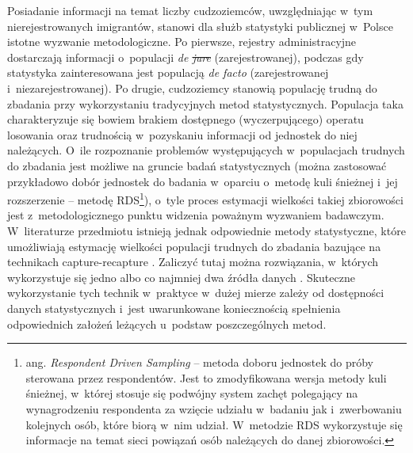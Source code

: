 \documentclass[12pt,a4paper]{article}
\providecommand{\DIFadd}[1]{{\protect\color{blue}\uwave{#1}}} %
\providecommand{\DIFdel}[1]{{\protect\color{red}\sout{#1}}}                      %
\providecommand{\DIFaddbegin}{} %
\providecommand{\DIFaddend}{} %
\providecommand{\DIFdelbegin}{} %
\providecommand{\DIFdelend}{} %
\begin{document}
Posiadanie informacji na temat liczby cudzoziemców, uwzględniając w~tym nierejestrowanych imigrantów, stanowi dla służb statystyki publicznej w~Polsce istotne wyzwanie metodologiczne. Po pierwsze, rejestry administracyjne dostarczają informacji o~populacji \textit{de \DIFdelbegin \DIFdel{jure}\DIFdelend \DIFaddbegin \DIFadd{iure}\DIFaddend } (zarejestrowanej), podczas gdy statystyka zainteresowana jest populacją \textit{de facto} (zarejestrowanej i~niezarejestrowanej). Po drugie, cudzoziemcy stanowią populację trudną do zbadania przy wykorzystaniu tradycyjnych metod statystycznych. Populacja taka charakteryzuje się bowiem brakiem dostępnego (wyczerpującego) operatu losowania oraz trudnością w~pozyskaniu informacji od jednostek do niej należących. O~ile rozpoznanie problemów występujących w~populacjach trudnych do zbadania jest możliwe na gruncie badań statystycznych (można zastosować przykładowo dobór jednostek do badania w~oparciu o~metodę kuli śnieżnej i~jej rozszerzenie -- metodę RDS\footnote{ang. \textit{Respondent Driven Sampling} -- metoda doboru jednostek do próby sterowana przez respondentów. Jest to zmodyfikowana wersja metody kuli śnieżnej, w~której stosuje się podwójny system zachęt polegający na wynagrodzeniu respondenta za wzięcie udziału w~badaniu jak i~zwerbowaniu kolejnych osób, które biorą w~nim udział. W~metodzie RDS wykorzystuje się informacje na temat sieci powiązań osób należących do danej zbiorowości.}), o~tyle proces estymacji wielkości takiej zbiorowości jest z~metodologicznego punktu widzenia poważnym wyzwaniem badawczym. W~literaturze przedmiotu istnieją jednak odpowiednie metody statystyczne, które umożliwiają estymację wielkości populacji trudnych do zbadania bazujące na technikach capture-recapture \citep[por.][]{bohning-capture-recapture-2017}. Zaliczyć tutaj można rozwiązania, w~których wykorzystuje się jedno \citep[por.][]{van2003point, godwin2017estimation} albo co najmniej dwa źródła danych \citep[por.][]{van2012people, zhang2008developing}. Skuteczne wykorzystanie tych technik w~praktyce w~dużej mierze zależy od dostępności danych statystycznych i~jest uwarunkowane koniecznością spełnienia odpowiednich założeń leżących u~podstaw poszczególnych metod.
\end{document}
